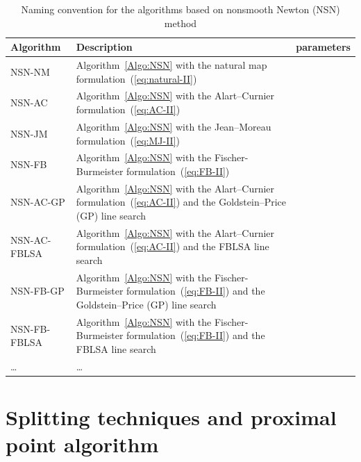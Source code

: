 \begin{table}[htbp]
  \centering
  \begin{tabular}{|l|p{}|l|}
    \hline
    { Algorithm}
    & Description 
    & parameters\\
    \hline
    \sf NSN-NM 
    &  Algorithm~\ref{Algo:NSN} with the natural map formulation~(\ref{eq:natural-II})
    & \\
    \hline
    \sf NSN-AC
    &  Algorithm~\ref{Algo:NSN} with the Alart--Curnier formulation~(\ref{eq:AC-II})
    & \\
    \hline
    \sf NSN-JM 
    &  Algorithm~\ref{Algo:NSN} with the Jean--Moreau formulation~(\ref{eq:MJ-II})
    & \\
    \hline
    \sf NSN-FB 
    &  Algorithm~\ref{Algo:NSN} with the Fischer-Burmeister formulation~(\ref{eq:FB-II})
    & \\
    \hline
    \sf NSN-AC-GP
    &  Algorithm~\ref{Algo:NSN} with the Alart--Curnier formulation~(\ref{eq:AC-II}) and the Goldstein--Price (GP) line search
    & \\
    \hline
    \sf NSN-AC-FBLSA
    &  Algorithm~\ref{Algo:NSN} with the Alart--Curnier formulation~(\ref{eq:AC-II}) and the FBLSA line search
    & \\
    \hline
    \sf NSN-FB-GP 
    &  Algorithm~\ref{Algo:NSN} with the Fischer-Burmeister formulation~(\ref{eq:FB-II}) and the Goldstein--Price (GP) line search
    & \\
    \hline
    \sf NSN-FB-FBLSA
    &  Algorithm~\ref{Algo:NSN} with the Fischer-Burmeister formulation~(\ref{eq:FB-II}) and the  FBLSA line search
    & \\
    \hline
    \sf \ldots 
    &  \ldots
    & \\
    \hline
  \end{tabular}
  \caption{Naming convention for the algorithms based on nonsmooth Newton (NSN) method}
  \label{tab:NSN-algos}
\end{table}

\clearpage
\section{Splitting techniques and proximal point algorithm}
\label{Sec:SplittingTechniquesAndProx}


